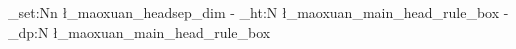 \dim_set:Nn \l_maoxuan_headsep_dim
{
	\headsep - \box_ht:N \l_maoxuan_main_head_rule_box
	         - \box_dp:N \l_maoxuan_main_head_rule_box %
}

